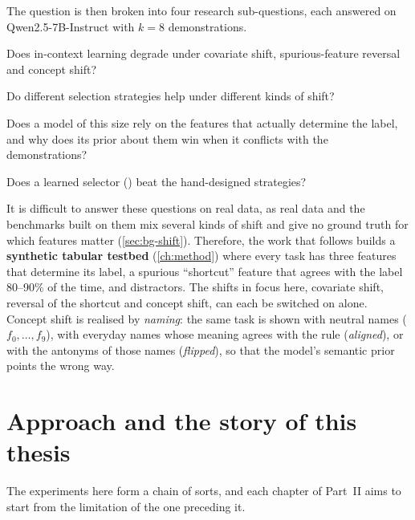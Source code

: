 The question is then broken into four research sub-questions, each answered on Qwen2.5-7B-Instruct \citep{qwen2024qwen25} with $k = 8$ demonstrations.

\begin{description}[leftmargin=2.4em, style=nextline]
  \item[\RQ1] Does in-context learning degrade under covariate shift, spurious-feature reversal and concept shift?
  \item[\RQ2] Do different selection strategies help under different kinds of shift?
  \item[\RQ3] Does a model of this size rely on the features that actually determine the label, and why does its prior about them win when it conflicts with the demonstrations?
  \item[\RQ4] Does a learned selector (\sata) beat the hand-designed strategies?
\end{description}


It is difficult to answer these questions on real data, as real data and the benchmarks built on them mix several kinds of shift and give no ground truth for which features matter (\autoref{sec:bg-shift}). Therefore, the work that follows builds a \textbf{synthetic tabular testbed} (\autoref{ch:method}) where every task has three features that determine its label, a spurious ``shortcut'' feature that agrees with the label 80--90\% of the time, and distractors. The shifts in focus here, covariate shift, reversal of the shortcut and concept shift, can each be switched on alone. Concept shift is realised by \emph{naming}: the same task is shown with neutral names ($f_0, \ldots, f_9$), with everyday names whose meaning agrees with the rule (\emph{aligned}), or with the antonyms of those names (\emph{flipped}), so that the model's semantic prior points the wrong way.

\newpage
\section{Approach and the story of this thesis}

The experiments here form a chain of sorts, and each chapter of Part~II aims to start from the limitation of the one preceding it.


